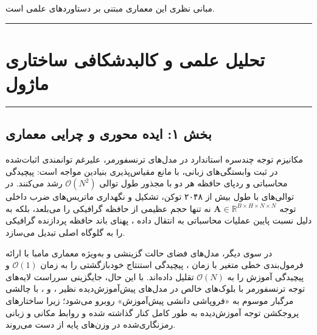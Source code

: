 \clearpage
{}
\vspace*{0.2cm}

مبانی نظری این معماری مبتنی بر دستاوردهای علمی \cite{gu2023mamba} است.
\noindent\rule{\textwidth}{1.2pt}
\vspace*{0.1cm}
\section{تحلیل علمی و کالبدشکافی ساختاری ماژول }
\label{sec:mod_svd_mamba}
\vspace*{-0.2cm}
\noindent\rule{\textwidth}{0.5pt}
\vspace*{0.3cm}

\subsection*{بخش ۱: ایده محوری و چرایی معماری }
مکانیزم توجه چندسره استاندارد  در مدل‌های ترنسفورمر، علیرغم توانمندی اثبات‌شده در ثبت وابستگی‌های زبانی، با مانع مقیاس‌پذیری بنیادین مواجه است: پیچیدگی محاسباتی و ردپای حافظه هر دو با مجذور طول توالی $\mathcal{O}(N^2)$ رشد می‌کنند. در توالی‌های با طول بیش از ۲۰۴۸ توکن، تشکیل و نگهداری ماتریس‌های ضرب داخلی توجه $\mathbf{A} \in \mathbb{R}^{B \times H \times N \times N}$ نه تنها حجم عظیمی از حافظه گرافیکی  را می‌بلعد، بلکه به دلیل نسبت پایین عملیات محاسباتی به انتقال داده ، پهنای باند حافظه پردازنده گرافیکی را به گلوگاه اصلی تبدیل می‌سازد.

در سوی دیگر، مدل‌های فضای حالت گزینشی  و به‌ویژه معماری مامبا  با ارائه فرمول‌بندی خطی متغیر با زمان ، پیچیدگی استنتاج خودبازگشتی را به زمان $\mathcal{O}(1)$ و پیچیدگی آموزش را به $\mathcal{O}(N)$ تقلیل داده‌اند. با این حال، جایگزینی سرراست لایه‌های توجه ترنسفورمر با بلوک‌های خالص  در مدل‌های پیش‌آموزش‌دیده  نظیر ،  و ، با چالشی مرگبار موسوم به «فروپاشی دانشی پیش‌آموزش» روبرو می‌شود؛ زیرا ساختارهای پروجکشن توجه آموزش‌دیده به طور کامل کنار گذاشته شده و روابط مکانی و زبانی رمزنگاری‌شده در وزن‌های پایه از دست می‌روند.

